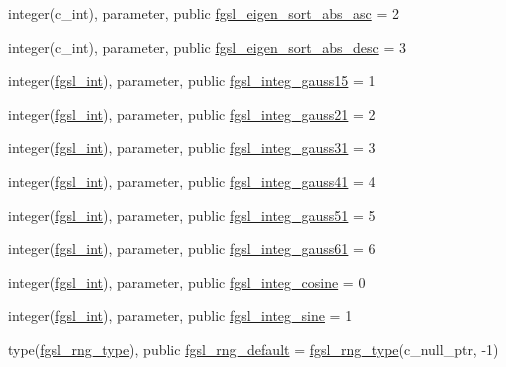\begin{DoxyCompactItemize}
\item 
integer(c\+\_\+int), parameter, public \hyperlink{namespacefgsl_a5cf81e4e6e4b769e96ca69bea62e2d14}{fgsl\+\_\+eigen\+\_\+sort\+\_\+abs\+\_\+asc} = 2
\item 
integer(c\+\_\+int), parameter, public \hyperlink{namespacefgsl_a0ed0d4f25aa5ae03cb6adfe004cf648e}{fgsl\+\_\+eigen\+\_\+sort\+\_\+abs\+\_\+desc} = 3
\item 
integer(\hyperlink{namespacefgsl_a222deda1d7a0c0e845ce4a683318efeb}{fgsl\+\_\+int}), parameter, public \hyperlink{namespacefgsl_ae892609677dce6cab285f1a12f956f84}{fgsl\+\_\+integ\+\_\+gauss15} = 1
\item 
integer(\hyperlink{namespacefgsl_a222deda1d7a0c0e845ce4a683318efeb}{fgsl\+\_\+int}), parameter, public \hyperlink{namespacefgsl_a3c4e8f9478c6a8ab3bab6580929c8894}{fgsl\+\_\+integ\+\_\+gauss21} = 2
\item 
integer(\hyperlink{namespacefgsl_a222deda1d7a0c0e845ce4a683318efeb}{fgsl\+\_\+int}), parameter, public \hyperlink{namespacefgsl_a6fd868988f11aa3c2ab7c6a3d60ab1a0}{fgsl\+\_\+integ\+\_\+gauss31} = 3
\item 
integer(\hyperlink{namespacefgsl_a222deda1d7a0c0e845ce4a683318efeb}{fgsl\+\_\+int}), parameter, public \hyperlink{namespacefgsl_a5c219f8f951d411c63849088e0e224da}{fgsl\+\_\+integ\+\_\+gauss41} = 4
\item 
integer(\hyperlink{namespacefgsl_a222deda1d7a0c0e845ce4a683318efeb}{fgsl\+\_\+int}), parameter, public \hyperlink{namespacefgsl_a8331538c5a42b13f0893e34864bae6d7}{fgsl\+\_\+integ\+\_\+gauss51} = 5
\item 
integer(\hyperlink{namespacefgsl_a222deda1d7a0c0e845ce4a683318efeb}{fgsl\+\_\+int}), parameter, public \hyperlink{namespacefgsl_ac82cf20c4bb7b1f3a6053020016abfed}{fgsl\+\_\+integ\+\_\+gauss61} = 6
\item 
integer(\hyperlink{namespacefgsl_a222deda1d7a0c0e845ce4a683318efeb}{fgsl\+\_\+int}), parameter, public \hyperlink{namespacefgsl_a32ea398e71abe5dd44ef510e11dcfa87}{fgsl\+\_\+integ\+\_\+cosine} = 0
\item 
integer(\hyperlink{namespacefgsl_a222deda1d7a0c0e845ce4a683318efeb}{fgsl\+\_\+int}), parameter, public \hyperlink{namespacefgsl_a4cc7312b9db6359e7b0cdc32f98ce88d}{fgsl\+\_\+integ\+\_\+sine} = 1
\item 
type(\hyperlink{structfgsl_1_1fgsl__rng__type}{fgsl\+\_\+rng\+\_\+type}), public \hyperlink{namespacefgsl_ab8c31f8079ad3a768a528cd525c8ccf2}{fgsl\+\_\+rng\+\_\+default} = \hyperlink{structfgsl_1_1fgsl__rng__type}{fgsl\+\_\+rng\+\_\+type}(c\+\_\+null\+\_\+ptr, -\/1)

\end{DoxyCompactItemize}
